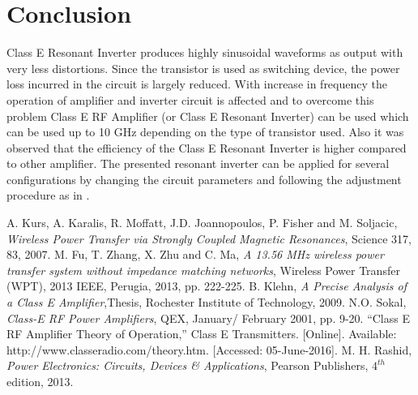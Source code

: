 \documentclass[journal,twoside]{IEEEtran}
\begin{document}
\section{Conclusion}
Class E Resonant Inverter produces highly sinusoidal
waveforms as output with very less distortions. Since the
transistor is used as switching device, the power loss incurred
in the circuit is largely reduced. With increase in frequency
the operation of amplifier and inverter circuit is affected and
to overcome this problem Class E RF Amplifier (or Class E
Resonant Inverter) can be used which can be used up to 10
GHz depending on the type of transistor used. Also it was
observed that the efficiency of the Class E Resonant Inverter is
higher compared to other amplifier. The presented resonant
inverter can be applied for several configurations by changing
the circuit parameters and following the adjustment procedure
as in \cite{Sokal2001}.


\begin{thebibliography}{9}

    A. Kurs, A. Karalis, R. Moffatt, J.D. Joannopoulos, P. Fisher and M. Soljacic, \textit{Wireless Power Transfer
    via Strongly Coupled Magnetic Resonances}, Science 317, 83, 2007.
    M. Fu, T. Zhang, X. Zhu and C. Ma, \textit{A 13.56 MHz wireless power transfer system without impedance
    matching networks}, Wireless Power Transfer (WPT), 2013 IEEE, Perugia, 2013, pp. 222-225.
    B. Klehn, \textit{A Precise Analysis of a Class E Amplifier},Thesis, Rochester Institute of Technology, 2009.
    N.O. Sokal, \textit{Class-E RF Power Amplifiers}, QEX, January/ February 2001, pp. 9-20.
    “Class E RF Amplifier Theory of Operation,” Class E Transmitters. 
    [Online]. Available: http://www.classeradio.com/theory.htm. [Accessed: 05-June-2016].
    M. H. Rashid, \textit{Power Electronics: Circuits, Devices \& Applications}, Pearson Publishers, $4^{th}$ edition, 2013.

\end{thebibliography}
\vspace{-3cm}
\end{document}
